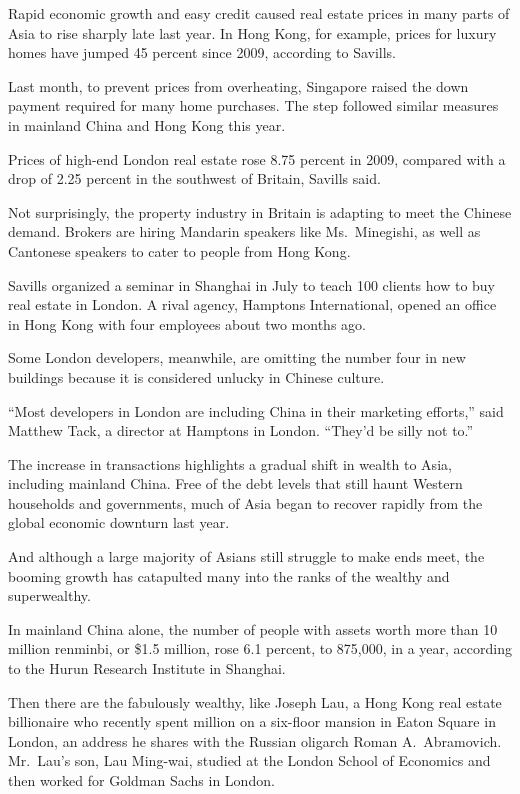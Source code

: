 ﻿\documentclass[12pt]{article}
\begin{document}
Rapid economic growth and easy credit caused real estate prices in many parts of Asia to rise
sharply late last year. In Hong Kong, for example, prices for luxury homes have jumped 45 percent
since 2009, according to Savills.

Last month, to prevent prices from overheating, Singapore raised the down payment required for many
home purchases. The step followed similar measures in mainland China and Hong Kong this year.

Prices of high-end London real estate rose 8.75 percent in 2009, compared with a drop of 2.25
percent in the southwest of Britain, Savills said.

Not surprisingly, the property industry in Britain is adapting to meet the Chinese demand. Brokers
are hiring Mandarin speakers like Ms.~Minegishi, as well as Cantonese speakers to cater to people
from Hong Kong.

Savills organized a seminar in Shanghai in July to teach 100 clients how to buy real estate in
London. A rival agency, Hamptons International, opened an office in Hong Kong with four employees
about two months ago.

Some London developers, meanwhile, are omitting the number four in new buildings because it is
considered unlucky in Chinese culture.

``Most developers in London are including China in their marketing efforts,'' said Matthew Tack, a
director at Hamptons in London. ``They'd be silly not to.''

The increase in transactions highlights a gradual shift in wealth to Asia, including mainland China.
Free of the debt levels that still haunt Western households and governments, much of Asia began to
recover rapidly from the global economic downturn last year.

And although a large majority of Asians still struggle to make ends meet, the booming growth has
catapulted many into the ranks of the wealthy and superwealthy.

In mainland China alone, the number of people with assets worth more than 10 million renminbi, or
\$1.5 million, rose 6.1 percent, to 875,000, in a year, according to the Hurun Research Institute in
Shanghai.

Then there are the fabulously wealthy, like Joseph Lau, a Hong Kong real estate billionaire who
recently spent  million on a six-floor mansion in Eaton Square in London, an address
he shares with the Russian oligarch Roman A.~Abramovich. Mr.~Lau's son, Lau Ming-wai, studied at the
London School of Economics and then worked for Goldman Sachs in London.
\end{document}
